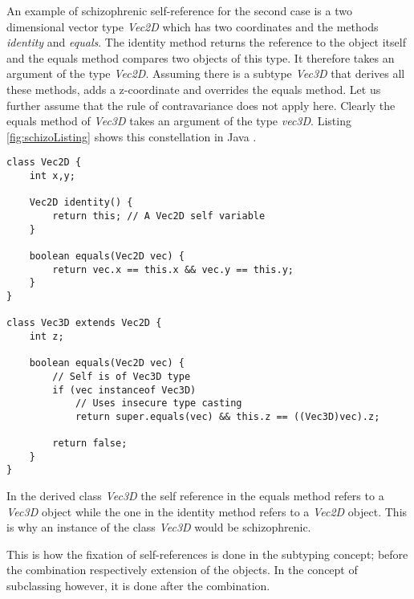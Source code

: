 An example of schizophrenic self-reference for the second case is a
two dimensional vector type \emph{Vec2D} which has two coordinates and
the methods \emph{identity} and \emph{equals}. The identity method
returns the reference to the object itself and the equals method
compares two objects of this type. It therefore takes an argument
of the type \emph{Vec2D}. Assuming there is a subtype \emph{Vec3D}
that derives all these methods, adds a z-coordinate and overrides the
equals method. Let us further assume that the rule of contravariance
does not apply here. Clearly the equals method of \emph{Vec3D} takes
an argument of the type \emph{vec3D}. Listing \ref{fig:schizoListing}
shows this constellation in Java \cite{simons_theory_2003-2}.

\begin{lstlisting}[float=ht,caption={An example of schizophrenic self-reference},label={fig:schizoListing}]
class Vec2D {
	int x,y;

	Vec2D identity() {
		return this; // A Vec2D self variable
	}

	boolean equals(Vec2D vec) {
		return vec.x == this.x && vec.y == this.y;
	}
}

class Vec3D extends Vec2D {
	int z;

	boolean equals(Vec2D vec) {
		// Self is of Vec3D type
		if (vec instanceof Vec3D)
			// Uses insecure type casting
			return super.equals(vec) && this.z == ((Vec3D)vec).z;

		return false;
	}
}
\end{lstlisting}

In the derived class \emph{Vec3D} the self reference in the equals
method refers to a \emph{Vec3D} object while the one in the identity method
refers to a \emph{Vec2D} object. This is why an instance of the class
\emph{Vec3D} would be schizophrenic.

This is how the fixation of self-references is done in the subtyping
concept; before the combination respectively extension of the objects. In the
concept of subclassing however, it is done after the combination.


